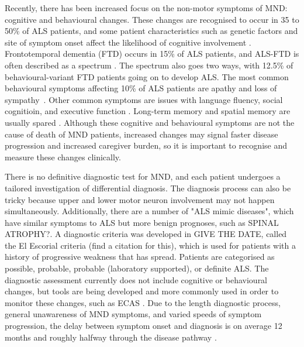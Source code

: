 Recently, there has been increased focus on the non-motor symptoms of MND: cognitive and behavioural changes. These changes are recognised to occur in 35 to 50\% of ALS patients, and some patient characteristics such as genetic factors and site of symptom onset affect the likelihood of cognitive involvement \cite{yangRiskFactorsCognitive2021, chioALSPhenotypeInfluenced2020}. Frontotemporal dementia (FTD) occurs in 15\% of ALS patients, and ALS-FTD is often described as a spectrum \cite{strongAmyotrophicLateralSclerosis2017}. The spectrum also goes two ways, with 12.5\% of behavioural-variant FTD patients going on to develop ALS.
The most common behavioural symptoms affecting 10\% of ALS patients are apathy and loss of sympathy~\cite{abrahamsScreeningCognitionBehaviour2014}. Other common symptoms are issues with language fluency, social cognitioin, and executive function \cite{beeldmanCognitiveProfileALS2016}. Long-term memory and spatial memory are usually spared \cite{crockfordALSspecificCognitiveBehavior2018}. Although these cognitive and behavioural symptoms are not the cause of death of MND patients, increased changes may signal faster disease progression and increased caregiver burden, so it is important to recognise and measure these changes clinically.

There is no definitive diagnostic test for MND, and each patient undergoes a tailored investigation of differential diagnosis. The diagnosis process can also be tricky because upper and lower motor neuron involvement may not happen simultaneously. Additionally, there are a number of "ALS mimic diseases", which have similar symptoms to ALS but more benign prognoses, such as SPINAL ATROPHY?. A diagnostic criteria was developed in GIVE THE DATE, called the El Escorial criteria (find a citation for this), which is used for patients with a history of progressive weakness that has spread. Patients are categorised as possible, probable, probable (laboratory supported), or definite ALS.
The diagnostic assessment currently does not include cognitive or behavioural changes, but tools are being developed and more commonly used in order to monitor these changes, such as ECAS \cite{abrahamsScreeningCognitionBehaviour2014}.
Due to the length diagnostic process, general unawareness of MND symptoms, and varied speeds of symptom progression, the delay between symptom onset and diagnosis is on average 12 months and roughly halfway through the disease pathway \cite{mitchellTimelinesDiagnosticEvaluation2010}.

